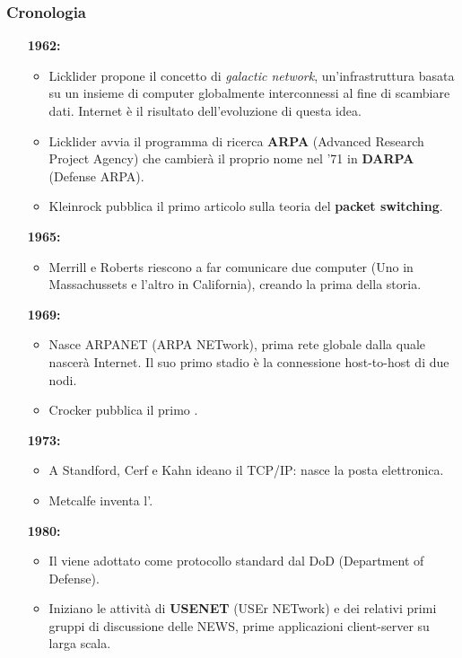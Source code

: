 \documentclass[a4paper,11pt]{article}
\def\subsub#1{\subsubsection{#1}\label{#1}}
\def\vedi#1{\nameref{#1}}
\begin{document}
\subsub{Cronologia}
\begin{itemize}
\item[\textbf{1962:}] \begin{itemize}
\item Licklider propone il concetto di \textit{galactic network}, un'infrastruttura basata su un insieme di computer globalmente interconnessi al fine di scambiare dati. Internet è il risultato dell'evoluzione di questa idea.
\item Licklider avvia il programma di ricerca \textbf{ARPA} (Advanced Research Project Agency) che cambierà il proprio nome  nel '71 in \textbf{DARPA} (Defense ARPA).
\item Kleinrock pubblica il primo articolo sulla teoria del \textbf{packet switching}.
\end{itemize}
\item[\textbf{1965:}] \begin{itemize}
\item Merrill e Roberts riescono a far comunicare due computer (Uno in Massachussets e l'altro in California), creando la prima \vedi{WAN} della storia.
\end{itemize} 

\item[\textbf{1969:}] \begin{itemize}
\item Nasce ARPANET (ARPA NETwork), prima rete globale dalla quale nascerà Internet. Il suo primo stadio è la connessione host-to-host di due nodi.
\item Crocker pubblica il primo \vedi{RFC}.
\end{itemize} 

\item[\textbf{1973:}] \begin{itemize}
\item A Standford, Cerf e Kahn ideano il TCP/IP: nasce la posta elettronica.
\item Metcalfe inventa l'\vedi{Ethernet}.
\end{itemize}

\item[\textbf{1980:}] \begin{itemize}
\item Il \vedi{TCP} viene adottato come protocollo standard dal DoD (Department of Defense).
\item Iniziano le attività di \textbf{USENET} (USEr NETwork) e dei relativi primi gruppi di discussione delle NEWS, prime applicazioni client-server su larga scala.
\end{itemize} 


\end{itemize}
\end{document}
